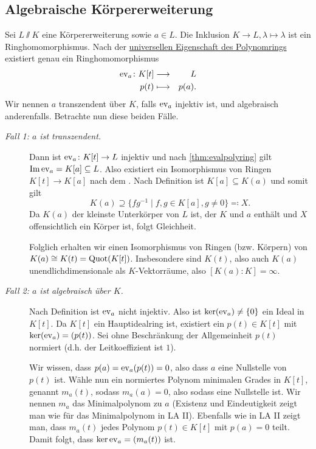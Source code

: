 \documentclass[12pt,a4paper]{scrartcl}
\begin{document}
\subsection{Algebraische Körpererweiterung}
Sei $L\sslash K$ eine Körpererweiterung sowie $a\in L$. Die Inklusion $K\to L, \lambda\mapsto\lambda$ ist ein Ringhomomorphismus. Nach der \hyperref[thm:unieig_polyring]{universellen Eigenschaft des Polynomrings} existiert genau ein Ringhomomorphismus
\begin{eqnarray*}
	\operatorname{ev}_a\colon K[t] &\longrightarrow & L\\
	p(t) & \longmapsto & p(a).
\end{eqnarray*}
Wir nennen $a$ transzendent über $K$, falls $\operatorname{ev}_a$ injektiv ist, und algebraisch anderenfalls. Betrachte nun diese beiden Fälle.
\begin{description}
	\item[\emph{Fall 1: $a$ ist transzendent.}] Dann ist $\operatorname{ev}_a\colon  K[t]\to L$ injektiv und nach \cref{thm:evalpolyring} gilt $\operatorname{Im}\operatorname{ev}_a = K[a]\subseteq L$.
	Also existiert ein Isomorphismus von Ringen $K[t]\to K[a]$ nach dem . Nach Definition ist $K[a]\subseteq K(a)$ und somit gilt
	\[K(a) \supseteq \{fg^{-1}\mid f,g\in K[a], g\neq 0\} \eqqcolon X.\]
	Da $K(a)$ der kleinste Unterkörper von $L$ ist, der $K$ und $a$ enthält und $X$ offensichtlich ein Körper ist, folgt Gleichheit.
	
	Folglich erhalten wir einen Isomorphismus von Ringen (bzw. Körpern) von $K(a)\cong K(t) = \operatorname{Quot}(K[t])$. Insbesondere sind $K(t)$, also auch $K(a)$ unendlichdimensionale als $K$-Vektorräume, also $[K(a):K] = \infty$.
	
	\item[\emph{Fall 2: $a$ ist algebraisch über $K$.}] Nach Definition ist $\operatorname{ev}_a$ nicht injektiv. Also ist $\operatorname{ker}(\operatorname{ev}_a)\neq \{0\}$ ein Ideal in $K[t]$. Da $K[t]$ ein Hauptidealring ist, existiert ein $p(t)\in K[t]$ mit $\operatorname{ker}(\operatorname{ev}_a) = (p(t))$. Sei ohne Beschränkung der Allgemeinheit $p(t)$ normiert (d.h. der Leitkoeffizient ist $1$).
	
	Wir wissen, dass $p(a) = \operatorname{ev}_a(p(t)) = 0$, also dass $a$ eine Nullstelle von $p(t)$ ist. Wähle nun ein normiertes Polynom minimalen Grades in $K[t]$, genannt $m_a(t)$, sodass $m_a(a) = 0$, also sodass eine Nullstelle ist. Wir nennen $m_a$ das Minimalpolynom zu $a$ (Existenz und Eindeutigkeit zeigt man wie für das Minimalpolynom in LA II). Ebenfalls wie in LA II zeigt man, dass $m_a(t)$ jedes Polynom $p(t)\in K[t]$ mit $p(a)=0$ teilt. Damit folgt, dass $\operatorname{ker}\operatorname{ev}_a = (m_a(t))$ ist.


\end{description}
\end{document}
